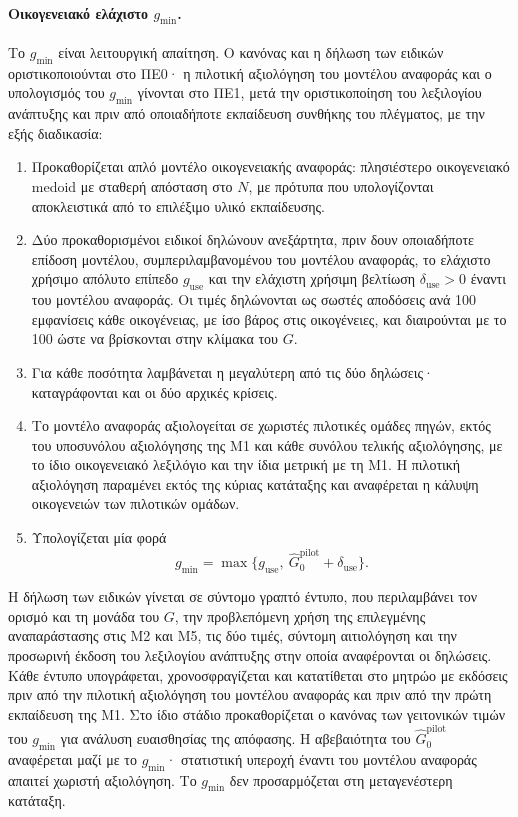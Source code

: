 \documentclass[11pt,a4paper]{article}
\begin{document}
\paragraph{Οικογενειακό ελάχιστο \(g_{\min}\).}
Το \(g_{\min}\) είναι λειτουργική απαίτηση. Ο κανόνας και η δήλωση των ειδικών οριστικοποιούνται στο ΠΕ0· η πιλοτική αξιολόγηση του μοντέλου αναφοράς και ο υπολογισμός του \(g_{\min}\) γίνονται στο ΠΕ1, μετά την οριστικοποίηση του λεξιλογίου ανάπτυξης και πριν από οποιαδήποτε εκπαίδευση συνθήκης του πλέγματος, με την εξής διαδικασία:
\begin{enumerate}
\item Προκαθορίζεται απλό μοντέλο οικογενειακής αναφοράς: πλησιέστερο οικογενειακό medoid με σταθερή απόσταση στο \(N\), με πρότυπα που υπολογίζονται αποκλειστικά από το επιλέξιμο υλικό εκπαίδευσης.
\item Δύο προκαθορισμένοι ειδικοί δηλώνουν ανεξάρτητα, πριν δουν οποιαδήποτε επίδοση μοντέλου, συμπεριλαμβανομένου του μοντέλου αναφοράς, το ελάχιστο χρήσιμο απόλυτο επίπεδο \(g_{\mathrm{use}}\) και την ελάχιστη χρήσιμη βελτίωση \(\delta_{\mathrm{use}}>0\) έναντι του μοντέλου αναφοράς. Οι τιμές δηλώνονται ως σωστές αποδόσεις ανά 100 εμφανίσεις κάθε οικογένειας, με ίσο βάρος στις οικογένειες, και διαιρούνται με το 100 ώστε να βρίσκονται στην κλίμακα του \(G\).
\item Για κάθε ποσότητα λαμβάνεται η μεγαλύτερη από τις δύο δηλώσεις· καταγράφονται και οι δύο αρχικές κρίσεις.
\item Το μοντέλο αναφοράς αξιολογείται σε χωριστές πιλοτικές ομάδες πηγών, εκτός του υποσυνόλου αξιολόγησης της M1 και κάθε συνόλου τελικής αξιολόγησης, με το ίδιο οικογενειακό λεξιλόγιο και την ίδια μετρική με τη M1. Η πιλοτική αξιολόγηση παραμένει εκτός της κύριας κατάταξης και αναφέρεται η κάλυψη οικογενειών των πιλοτικών ομάδων.
\item Υπολογίζεται μία φορά
\[
g_{\min}=\max\bigl\{g_{\mathrm{use}},\ \widehat G_{0}^{\mathrm{pilot}}+\delta_{\mathrm{use}}\bigr\}.
\]
\end{enumerate}
Η δήλωση των ειδικών γίνεται σε σύντομο γραπτό έντυπο, που περιλαμβάνει τον ορισμό και τη μονάδα του \(G\), την προβλεπόμενη χρήση της επιλεγμένης αναπαράστασης στις M2 και M5, τις δύο τιμές, σύντομη αιτιολόγηση και την προσωρινή έκδοση του λεξιλογίου ανάπτυξης στην οποία αναφέρονται οι δηλώσεις. Κάθε έντυπο υπογράφεται, χρονοσφραγίζεται και κατατίθεται στο μητρώο με εκδόσεις πριν από την πιλοτική αξιολόγηση του μοντέλου αναφοράς και πριν από την πρώτη εκπαίδευση της M1. Στο ίδιο στάδιο προκαθορίζεται ο κανόνας των γειτονικών τιμών του \(g_{\min}\) για ανάλυση ευαισθησίας της απόφασης. Η αβεβαιότητα του \(\widehat G_{0}^{\mathrm{pilot}}\) αναφέρεται μαζί με το \(g_{\min}\)· στατιστική υπεροχή έναντι του μοντέλου αναφοράς απαιτεί χωριστή αξιολόγηση. Το \(g_{\min}\) δεν προσαρμόζεται στη μεταγενέστερη κατάταξη.
\end{document}

